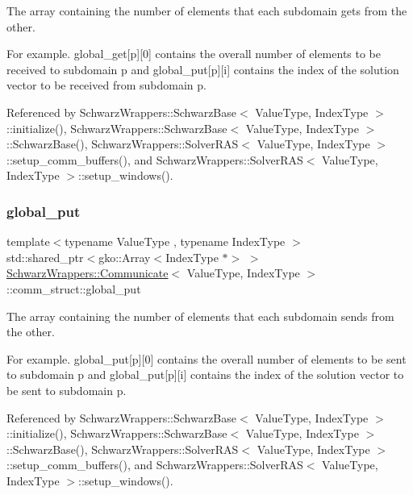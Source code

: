 The array containing the number of elements that each subdomain gets from the other. 

For example. global\+\_\+get\mbox{[}p\mbox{]}\mbox{[}0\mbox{]} contains the overall number of elements to be received to subdomain p and global\+\_\+put\mbox{[}p\mbox{]}\mbox{[}i\mbox{]} contains the index of the solution vector to be received from subdomain p. 

Referenced by Schwarz\+Wrappers\+::\+Schwarz\+Base$<$ Value\+Type, Index\+Type $>$\+::initialize(), Schwarz\+Wrappers\+::\+Schwarz\+Base$<$ Value\+Type, Index\+Type $>$\+::\+Schwarz\+Base(), Schwarz\+Wrappers\+::\+Solver\+R\+A\+S$<$ Value\+Type, Index\+Type $>$\+::setup\+\_\+comm\+\_\+buffers(), and Schwarz\+Wrappers\+::\+Solver\+R\+A\+S$<$ Value\+Type, Index\+Type $>$\+::setup\+\_\+windows().

\mbox{\label{structSchwarzWrappers_1_1Communicate_1_1comm__struct_a406f1f74a5a55deed3f6eb1a4ee21ac0}} 
\subsubsection{\texorpdfstring{global\+\_\+put}{global\_put}}
{\footnotesize\ttfamily template$<$typename Value\+Type , typename Index\+Type $>$ \\
std\+::shared\+\_\+ptr$<$gko\+::\+Array$<$Index\+Type $\ast$$>$ $>$ \hyperlink{classSchwarzWrappers_1_1Communicate}{Schwarz\+Wrappers\+::\+Communicate}$<$ Value\+Type, Index\+Type $>$\+::comm\+\_\+struct\+::global\+\_\+put}



The array containing the number of elements that each subdomain sends from the other. 

For example. global\+\_\+put\mbox{[}p\mbox{]}\mbox{[}0\mbox{]} contains the overall number of elements to be sent to subdomain p and global\+\_\+put\mbox{[}p\mbox{]}\mbox{[}i\mbox{]} contains the index of the solution vector to be sent to subdomain p. 

Referenced by Schwarz\+Wrappers\+::\+Schwarz\+Base$<$ Value\+Type, Index\+Type $>$\+::initialize(), Schwarz\+Wrappers\+::\+Schwarz\+Base$<$ Value\+Type, Index\+Type $>$\+::\+Schwarz\+Base(), Schwarz\+Wrappers\+::\+Solver\+R\+A\+S$<$ Value\+Type, Index\+Type $>$\+::setup\+\_\+comm\+\_\+buffers(), and Schwarz\+Wrappers\+::\+Solver\+R\+A\+S$<$ Value\+Type, Index\+Type $>$\+::setup\+\_\+windows().

